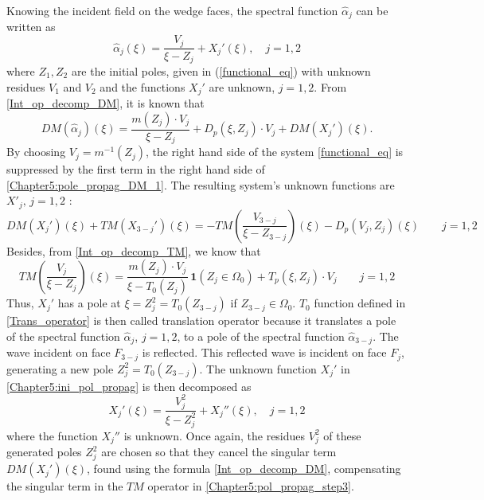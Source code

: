 Knowing the incident field on the wedge faces, the spectral function  $\hat{\alpha}_j$ can be written as
\begin{equation}
\label{Chapter5:ini_pol_propag}
\hat{\alpha}_j(\xi) = \dfrac{V_j}{\xi - Z_j} + X_j'(\xi), \quad j=1,2
\end{equation}
where $Z_1,Z_2$ are the initial poles, given in (\ref{functional_eq}) with unknown residues $V_1$ and $V_2$ and the functions $X_j'$ are unknown, $j=1,2$. From \eqref{Int_op_decomp_DM}, it is known that
\begin{equation}
\label{Chapter5:pole_propag_DM_1}
DM(\hat{\alpha}_j)(\xi) = \dfrac{m(Z_j) \cdot V_j}{\xi - Z_j} + D_p(\xi,Z_j)\cdot V_j + DM( X_j')(\xi).
\end{equation}
By choosing $V_j =  m^{-1}(Z_j)$, the right hand side of the system \eqref{functional_eq} is suppressed by the first term in the right hand side of \eqref{Chapter5:pole_propag_DM_1}. The resulting system's unknown functions are $X'_j, \, j=1,2$ :
\begin{equation}
DM  (X_j' )(\xi)+ TM (X_{3-j}' )(\xi) = - TM  \left(  \dfrac{V_{3-j}}{\xi - Z_{3-j}} \right) (\xi)  - D_p(V_j,Z_j)(\xi) \qquad j=1,2
\end{equation}
Besides, from \eqref{Int_op_decomp_TM}, we know that
\begin{equation}
\label{Chapter5:pol_propag_step3}
TM  \left(  \dfrac{V_j}{\xi - Z_j} \right)(\xi) = \dfrac{m(Z_j) \cdot V_j}{\xi - T_0(Z_j)}  \, \mathbf{1}(Z_j \in \Omega_0) + T_p(\xi,Z_j)\cdot V_j \qquad j=1,2
\end{equation}
Thus, $X_j'$ has a pole at $\xi = Z_j^2 = T_0(Z_{3-j})$ if $Z_{3-j} \in \Omega_0$. $T_0$ function defined in \eqref{Trans_operator} is then called translation operator because it translates a pole of the spectral function $\hat{\alpha}_j$, $j=1,2$, to a pole of the spectral function $\hat{\alpha}_{3-j}$. The wave incident on face $F_{3-j}$ is reflected. This reflected wave is incident on face $F_j$, generating a new pole $Z_j^2=T_0(Z_{3-j})$. 
The unknown function $X_j'$ in \eqref{Chapter5:ini_pol_propag} is then decomposed as
\begin{equation}
\label{Chapter5:pol_propag_step2}
X_j'(\xi) =  \dfrac{V_j^2}{\xi - Z_j^2} + X_j''(\xi), \quad j=1,2
\end{equation}
where the function $ X_j''$ is unknown. 
Once again, the residues $V_j^2$ of these generated poles $Z_j^2$ are chosen so that they cancel the singular term $DM(X_j')(\xi)$, found using the formula \eqref{Int_op_decomp_DM}, compensating the singular term in the $TM$ operator in \eqref{Chapter5:pol_propag_step3}.

